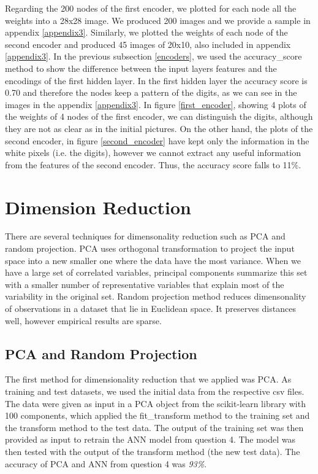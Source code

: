 \documentclass[12pt]{article}
\begin{document}
	Regarding the 200 nodes of the first encoder, we plotted for each node all the weights into a 28x28 image. We produced 200 images and we provide a sample in appendix \ref{appendix3}. Similarly, we plotted the weights of each node of the second encoder and produced 45 images of 20x10, also included in appendix \ref{appendix3}. In the previous subsection \ref{encoders}, we used the accuracy\_score method to show the difference between the input layers features and the encodings of the first hidden layer. In the first hidden layer the accuracy score is 0.70 and therefore the nodes keep a pattern of the digits, as we can see in the images in the appendix \ref{appendix3}. In figure \ref{first_encoder}, showing 4 plots of the weights of 4 nodes of the first encoder, we can distinguish the digits, although they are not as clear as in the initial pictures. On the other hand, the plots of the second encoder, in figure  \ref{second_encoder} have kept only the information in the white pixels (i.e. the digits), however we cannot extract any useful information from the features of the second encoder. Thus, the accuracy score falls to 11\%.
	
	\section{Dimension Reduction}
	
	There are several techniques for dimensonality reduction such as PCA and random projection. PCA uses orthogonal transformation to project the input space into a new smaller one where the data have the most variance. When we have a large set of correlated variables, principal components summarize this set with a smaller number of representative variables that explain most of the variability in the original set. Random projection method reduces dimensonality of observations in a dataset that lie in Euclidean space. It preserves distances well, however empirical results are sparse.
	
	\subsection{PCA and Random Projection}
	
	The first method for dimensionality reduction that we applied was PCA. As training and test datasets, we used the initial data from the respective csv files. The data were given as input in a PCA object from the scikit-learn library with 100 components, which applied the fit\_transform method to the training set and the transform method to the test data. The output of the training set was then provided as input to retrain the ANN model from question 4. The model was then tested with the output of the transform method (the new test data). The accuracy of PCA and ANN from question 4 was \emph{93\%}.
	
\end{document}
